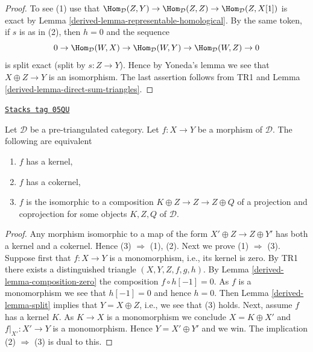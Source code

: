 \begin{proof}

To see (1) use that
$\Hom_\mathcal{D}(Z, Y) \to \Hom_\mathcal{D}(Z, Z) \to
\Hom_\mathcal{D}(Z, X[1])$
is exact by
Lemma \ref{derived-lemma-representable-homological}.
By the same token, if $s$ is as in (2), then $h = 0$ and the sequence
$$
0 \to \Hom_\mathcal{D}(W, X) \to \Hom_\mathcal{D}(W, Y)
\to \Hom_\mathcal{D}(W, Z) \to 0
$$
is split exact (split by $s : Z \to Y$). Hence by Yoneda's lemma we
see that $X \oplus Z \to Y$ is an isomorphism. The last assertion follows
from TR1 and
Lemma \ref{derived-lemma-direct-sum-triangles}.
\end{proof}

\begin{lemma}
\label{derived-lemma-when-split}
\href{https://stacks.math.columbia.edu/tag/05QU}{\texttt{Stacks tag 05QU}}

Let $\mathcal{D}$ be a pre-triangulated category.
Let $f : X \to Y$ be a morphism of $\mathcal{D}$.
The following are equivalent
\begin{enumerate}
\item $f$ has a kernel,
\item $f$ has a cokernel,
\item $f$ is the isomorphic to a composition
$K \oplus Z \to Z \to Z \oplus Q$ of a projection and coprojection
for some objects $K, Z, Q$ of $\mathcal{D}$.
\end{enumerate}
\end{lemma}

\begin{proof}

Any morphism isomorphic to a map of the form
$X' \oplus Z \to Z \oplus Y'$ has both a kernel and a cokernel.
Hence (3) $\Rightarrow$ (1), (2).
Next we prove (1) $\Rightarrow$ (3).
Suppose first that $f : X \to Y$ is a monomorphism, i.e., its kernel is zero.
By TR1 there exists a distinguished triangle $(X, Y, Z, f, g, h)$.
By Lemma \ref{derived-lemma-composition-zero} the composition
$f \circ h[-1] = 0$. As $f$ is a monomorphism we see that $h[-1] = 0$
and hence $h = 0$. Then
Lemma \ref{derived-lemma-split}
implies that $Y = X \oplus Z$, i.e., we see that (3) holds.
Next, assume $f$ has a kernel $K$. As $K \to X$ is a monomorphism we
conclude $X = K \oplus X'$ and $f|_{X'} : X' \to Y$ is a monomorphism.
Hence $Y = X' \oplus Y'$ and we win.
The implication (2) $\Rightarrow$ (3) is dual to this.
\end{proof}

